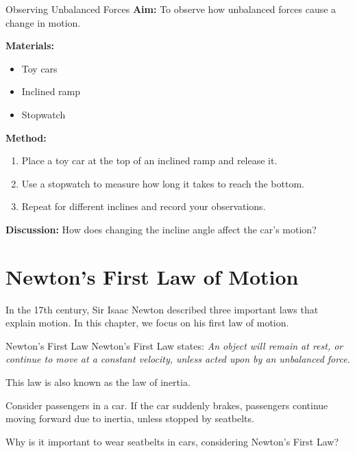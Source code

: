 \begin{investigation}{Observing Unbalanced Forces}
\textbf{Aim:} To observe how unbalanced forces cause a change in motion.

\textbf{Materials:}
\begin{itemize}
    \item Toy cars
    \item Inclined ramp
    \item Stopwatch
\end{itemize}

\textbf{Method:}
\begin{enumerate}
    \item Place a toy car at the top of an inclined ramp and release it.
    \item Use a stopwatch to measure how long it takes to reach the bottom.
    \item Repeat for different inclines and record your observations.
\end{enumerate}

\textbf{Discussion:} How does changing the incline angle affect the car's motion?
\end{investigation}

\section{Newton’s First Law of Motion}

In the 17th century, Sir Isaac Newton described three important laws that explain motion. In this chapter, we focus on his first law of motion.

\begin{keyconcept}{Newton’s First Law}
Newton’s First Law states: \textit{An object will remain at rest, or continue to move at a constant velocity, unless acted upon by an unbalanced force.}

This law is also known as the law of inertia.
\end{keyconcept}


\begin{example}
Consider passengers in a car. If the car suddenly brakes, passengers continue moving forward due to inertia, unless stopped by seatbelts.
\end{example}

\begin{stopandthink}
Why is it important to wear seatbelts in cars, considering Newton’s First Law?
\end{stopandthink}

